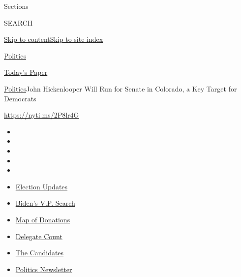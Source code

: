 Sections

SEARCH

\protect\hyperlink{site-content}{Skip to
content}\protect\hyperlink{site-index}{Skip to site index}

\href{https://www.nytimes.com/section/politics}{Politics}

\href{https://myaccount.nytimes.com/auth/login?response_type=cookie\&client_id=vi}{}

\href{https://www.nytimes.com/section/todayspaper}{Today's Paper}

\href{/section/politics}{Politics}\textbar{}John Hickenlooper Will Run
for Senate in Colorado, a Key Target for Democrats

\url{https://nyti.ms/2P8lr4G}

\begin{itemize}
\item
\item
\item
\item
\item
\end{itemize}

\begin{itemize}
\item
  \href{https://www.nytimes.com/2020/07/31/us/elections/biden-vs-trump.html?action=click\&pgtype=Article\&state=default\&region=TOP_BANNER\&context=storylines_menu}{Election
  Updates}
\item
  \href{https://www.nytimes.com/article/biden-vice-president-2020.html?action=click\&pgtype=Article\&state=default\&region=TOP_BANNER\&context=storylines_menu}{Biden's
  V.P. Search}
\item
  \href{https://www.nytimes.com/interactive/2020/07/24/us/politics/trump-biden-campaign-donors.html?action=click\&pgtype=Article\&state=default\&region=TOP_BANNER\&context=storylines_menu}{Map
  of Donations}
\item
  \href{https://www.nytimes.com/interactive/2020/us/elections/delegate-count-primary-results.html?action=click\&pgtype=Article\&state=default\&region=TOP_BANNER\&context=storylines_menu}{Delegate
  Count}
\item
  \href{https://www.nytimes.com/interactive/2019/us/politics/2020-presidential-candidates.html?action=click\&pgtype=Article\&state=default\&region=TOP_BANNER\&context=storylines_menu}{The
  Candidates}
\item
  \href{https://www.nytimes.com/newsletters/politics?action=click\&pgtype=Article\&state=default\&region=TOP_BANNER\&context=storylines_menu}{Politics
  Newsletter}
\end{itemize}

